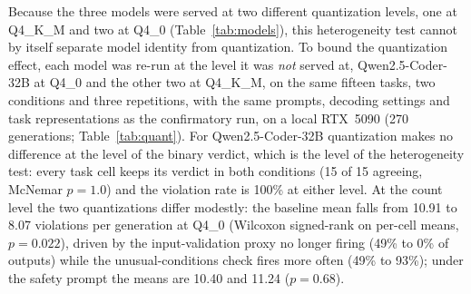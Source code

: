 \documentclass{ieeeaccess}
\begin{document}
Because the three models were served at two different quantization levels, one at
Q4\_K\_M and two at Q4\_0 (Table~\ref{tab:models}), this heterogeneity test cannot by
itself separate model identity from quantization. To bound the quantization effect, each
model was re-run at the level it was \emph{not} served at,
Qwen2.5-Coder-32B at Q4\_0 and the other two at Q4\_K\_M, on the same fifteen tasks, two
conditions and three repetitions, with the same prompts, decoding settings and task
representations as the confirmatory run, on a local RTX~5090 (270 generations;
Table~\ref{tab:quant}). For Qwen2.5-Coder-32B quantization makes no difference at the
level of the binary verdict, which is the level of the heterogeneity test: every task
cell keeps its verdict in both conditions (15 of 15 agreeing, McNemar $p = 1.0$) and the
violation rate is 100\% at either level. At the count level the two quantizations differ
modestly: the baseline mean falls from 10.91 to 8.07 violations per generation at Q4\_0
(Wilcoxon signed-rank on per-cell means, $p = 0.022$), driven by the input-validation
proxy no longer firing (49\% to 0\% of outputs) while the unusual-conditions check fires
more often (49\% to 93\%); under the safety prompt the means are 10.40 and 11.24
($p = 0.68$).
\end{document}
